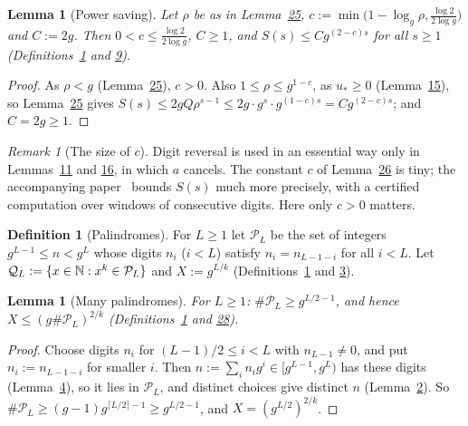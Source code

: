 \documentclass[11pt]{article}
\newcounter{hffc}
\theoremstyle{definition}\newtheorem{hffdef}[hffc]{Definition}
\theoremstyle{plain}\newtheorem{hfflem}[hffc]{Lemma}\newtheorem{hffthm}[hffc]{Theorem}
\theoremstyle{remark}\newtheorem{hffrem}[hffc]{Remark}
\newcommand{\hffcost}{}
\newcommand{\setcost}[1]{\renewcommand{\hffcost}{#1}}
\newcommand{\cP}{\mathcal{P}}\newcommand{\cQ}{\mathcal{Q}}\newcommand{\cB}{\mathcal{B}}\newcommand{\cT}{\mathcal{T}}
\begin{document}
\begin{hfflem}[Power saving]\label{L:saving}
Let $\rho$ be as in Lemma~\hyperref[L:twsum]{25}, $c:=\min\bigl(1-\log_g\rho,\frac{\log2}{2\log g}\bigr)$ and $C:=2g$. Then $0<c\le\frac{\log2}{2\log g}$, $C\ge1$, and $S(s)\le Cg^{(2-c)s}$ for all $s\ge1$ (Definitions~\hyperref[D:conv]{1} and \hyperref[D:psi]{9}).
\par\nopagebreak{}
\end{hfflem}
\begin{proof}\setcost{length 108/300}As $\rho<g$ (Lemma~\hyperref[L:twsum]{25}), $c>0$. Also $1\le\rho\le g^{1-c}$, as $u_*\ge0$ (Lemma~\hyperref[L:gap]{15}), so Lemma~\hyperref[L:twsum]{25} gives $S(s)\le2gQ\rho^{s-1}\le2g\cdot g^s\cdot g^{(1-c)s}=Cg^{(2-c)s}$; and $C=2g\ge1$.
\end{proof}

\begin{hffrem}[The size of $c$]\label{R:saving}
Digit reversal is used in an essential way only in Lemmas~\hyperref[L:prod]{11} and \hyperref[L:ident]{16}, in which $a$ cancels. The constant $c$ of Lemma~\hyperref[L:saving]{26} is tiny; the accompanying paper~\cite{Pal} bounds $S(s)$ much more precisely, with a certified computation over windows of consecutive digits. Here only $c>0$ matters.
\end{hffrem}

\begin{hffdef}[Palindromes]\label{D:pal}
For $L\ge1$ let $\cP_L$ be the set of integers $g^{L-1}\le n<g^L$ whose digits $n_i$ ($i<L$) satisfy $n_i=n_{L-1-i}$ for all $i<L$. Let $\cQ_L:=\{x\in\N:x^k\in\cP_L\}$ and $X:=g^{L/k}$ (Definitions~\hyperref[D:conv]{1} and \hyperref[D:digits]{3}).
\par\nopagebreak{}
\end{hffdef}

\begin{hfflem}[Many palindromes]\label{L:npal}
For $L\ge1$: $\#\cP_L\ge g^{L/2-1}$, and hence $X\le(g\#\cP_L)^{2/k}$ (Definitions~\hyperref[D:conv]{1} and \hyperref[D:pal]{28}).
\par\nopagebreak{}
\end{hfflem}
\begin{proof}\setcost{length 208/300}Choose digits $n_i$ for $(L-1)/2\le i<L$ with $n_{L-1}\ne0$, and put $n_i:=n_{L-1-i}$ for smaller $i$. Then $n:=\sum_in_ig^i\in[g^{L-1},g^L)$ has these digits (Lemma~\hyperref[L:window]{4}), so it lies in $\cP_L$, and distinct choices give distinct $n$ (Lemma~\hyperref[L:digits]{2}). So $\#\cP_L\ge(g-1)g^{\lceil L/2\rceil-1}\ge g^{L/2-1}$, and $X=(g^{L/2})^{2/k}$.
\end{proof}
\end{document}
